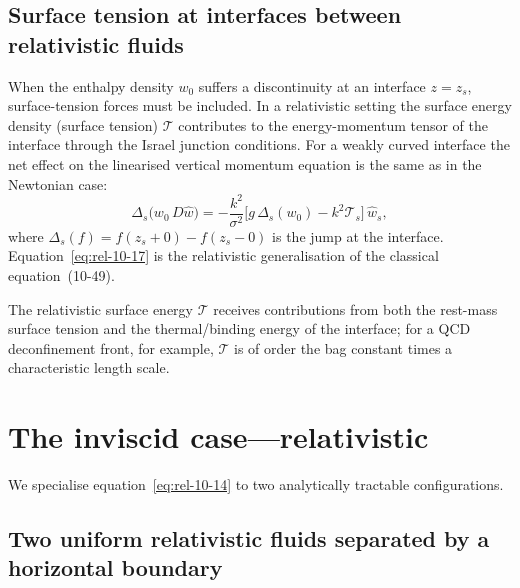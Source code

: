 \subsection{Surface tension at interfaces between relativistic fluids}
\label{sec:rel-91-surftens}

When the enthalpy density $w_{0}$ suffers a discontinuity at an
interface $z = z_{s}$, surface-tension forces must be included.
In a relativistic setting the surface energy density (surface tension)
$\mathcal{T}$ contributes to the energy-momentum tensor of the
interface through the Israel junction conditions.  For a weakly curved
interface the net effect on the linearised vertical momentum equation is
the same as in the Newtonian case:
\begin{equation}
\label{eq:rel-10-17}
\Delta_{s}\!\bigl(w_{0}\,D\hat{w}\bigr)
= -\frac{k^{2}}{\sigma^{2}}
  \bigl[g\,\Delta_{s}(w_{0}) - k^{2}\mathcal{T}_{s}\bigr]\,\hat{w}_{s},
\end{equation}
where $\Delta_{s}(f) = f(z_{s}+0)-f(z_{s}-0)$ is the jump at the
interface.  Equation~\eqref{eq:rel-10-17} is the relativistic
generalisation of the classical equation~(10-49).

The relativistic surface energy $\mathcal{T}$ receives contributions from
both the rest-mass surface tension and the thermal/binding energy of the
interface; for a QCD deconfinement front, for example, $\mathcal{T}$ is
of order the bag constant times a characteristic length scale.

\section{The inviscid case---relativistic}\label{sec:rel-92}

We specialise equation~\eqref{eq:rel-10-14} to two analytically
tractable configurations.

\subsection{Two uniform relativistic fluids separated by a horizontal
boundary}
\label{sec:rel-92-two}

